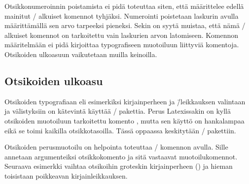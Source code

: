 \noindent
Otsikkonumeroinnin poistamista ei pidä toteuttaa siten, että määrittelee
edellä mainitut \-/ alkuiset komennot tyhjäksi. Numerointi
poistetaan laskurin  avulla määrittämällä sen arvo
tarpeeksi pieneksi. Sekin on syytä muistaa, että nämä \-/
alkuiset komennot on tarkoitettu vain laskurien arvon latomiseen.
Komennon määritelmään ei pidä kirjoittaa typografiseen muotoiluun
liittyviä komentoja. Otsikoiden ulkoasuun vaikutetaan muilla keinoilla.

\subsection{Otsikoiden ulkoasu}
\label{luku/otsikot-ulkoasu}

Otsikoiden typografiaan eli esimerkiksi kirjainperheen ja \=/leikkauksen
valintaan ja välistyksiin on kätevintä käyttää \-/
pakettia. Perus Latexissakin on kyllä otsikoiden muotoiluun tarkoitettu
komento , mutta sen käyttö on hankalampaa eikä
se toimi kaikilla otsikkotasoilla. Tässä oppaassa keskitytään
\-/ pakettiin.

Otsikoiden perusmuotoilu on helpointa toteuttaa
\-/ komennon avulla. Sille annetaan argumenteiksi
otsikkokomento ja sitä vastaavat muotoilukomennot. Seuraava esimerkki
vaihtaa otsikoihin groteskin kirjainperheen () ja
hieman toisistaan poikkeavan kirjainleikkauksen.

\begin{koodilohkosis}
\titleformat*{\section}      {\sffamily\bfseries\Large}
\titleformat*{\subsection}   {\sffamily\bfseries\itshape\large}
\titleformat*{\subsubsection}{\sffamily\bfseries\normalsize}
\end{koodilohkosis}

